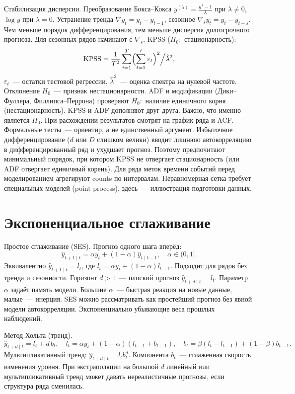 Стабилизация дисперсии. Преобразование Бокса--Кокса $y^{(\lambda)}=\frac{y^\lambda-1}{\lambda}$ при $\lambda\neq 0$, $\log y$ при $\lambda=0$.
Устранение тренда $\nabla y_t=y_t-y_{t-1}$, сезонное $\nabla_s y_t=y_t-y_{t-s}$.
Чем меньше порядок дифференцирования, тем меньше дисперсия долгосрочного прогноза. Для сезонных рядов начинают с $\nabla_s$.
KPSS ($H_0\colon$ стационарность): \[ \mathrm{KPSS}=\frac{1}{T^2}\sum_{i=1}^T\Bigl(\sum_{t=1}^i\varepsilon_t\Bigr)^2\Big/\hat\lambda^2, \] $\varepsilon_t$~--- остатки тестовой регрессии, $\hat\lambda^2$~--- оценка спектра на нулевой частоте.
Отклонение $H_0$~--- признак нестационарности.
ADF и модификации (Дики--Фуллера, Филлипса--Перрона) проверяют $H_0\colon$ наличие единичного корня (нестационарность).
KPSS и ADF дополняют друг друга. Важно, что именно является $H_0$.
При расхождении результатов смотрят на график ряда и ACF. Формальные тесты~--- ориентир, а не единственный аргумент. Избыточное дифференцирование ($d$ или $D$ слишком велики) вводит лишнюю автокорреляцию в дифференцированный ряд и ухудшает прогноз. Поэтому предпочитают минимальный порядок, при котором KPSS не отвергает стационарность (или ADF отвергает единичный корень).
Для ряда меток времени событий перед моделированием агрегируют counts по интервалам. Неравномерная сетка требует специальных моделей (point process), здесь~--- иллюстрация подготовки данных.

\section{Экспоненциальное сглаживание}

Простое сглаживание (SES). Прогноз одного шага вперёд: \[ \hat y_{t+1\mid t}=\alpha y_t+(1-\alpha)\hat y_{t\mid t-1}, \quad \alpha\in(0,1].
\] Эквивалентно $\hat y_{t+1\mid t}=l_t$, где $l_t=\alpha y_t+(1-\alpha)l_{t-1}$.
Подходит для рядов без тренда и сезонности. Горизонт $d>1$~--- плоский прогноз $\hat y_{t+d\mid t}=l_t$.
Параметр $\alpha$ задаёт память модели. Большие $\alpha$~--- быстрая реакция на новые данные, малые~--- инерция.
SES можно рассматривать как простейший прогноз без явной модели автокорреляции. Экспоненциально убывающие веса прошлых наблюдений.

Метод Хольта (тренд).\[ \hat y_{t+d\mid t}=l_t+d\,b_t, \quad l_t=\alpha y_t+(1-\alpha)(l_{t-1}+b_{t-1}), \quad b_t=\beta(l_t-l_{t-1})+(1-\beta)b_{t-1}.
\] Мультипликативный тренд: $\hat y_{t+d\mid t}=l_t b_t^d$.
Компонента $b_t$~--- сглаженная скорость изменения уровня. При экстраполяции на большой $d$ линейный или мультипликативный тренд может давать нереалистичные прогнозы, если структура ряда сменилась.

